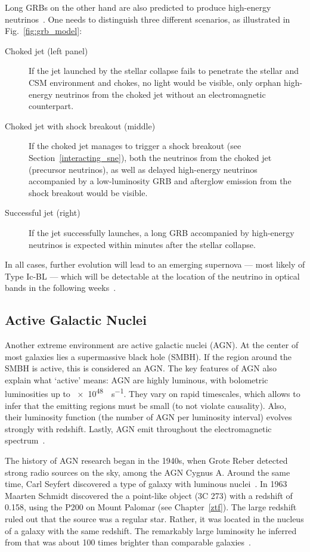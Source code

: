 Long GRBs on the other hand are also predicted to produce high-energy neutrinos~. One needs to distinguish three different scenarios, as illustrated in Fig.~\ref{fig:grb_model}:
\begin{description}
    \item[Choked jet (left panel)] If the jet launched by the stellar collapse fails to penetrate the stellar and CSM environment and chokes, no light would be visible, only orphan high-energy neutrinos from the choked jet without an electromagnetic counterpart.
    \item[Choked jet with shock breakout (middle)] If the choked jet manages to trigger a shock breakout (see Section~\ref{interacting_sne}), both the neutrinos from the choked jet (precursor neutrinos), as well as delayed high-energy neutrinos accompanied by a low-luminosity GRB and afterglow emission from the shock breakout would be visible.
    \item[Successful jet (right)] If the jet successfully launches, a long GRB accompanied by high-energy neutrinos is expected within minutes after the stellar collapse.
\end{description}

In all cases, further evolution will lead to an emerging supernova --- most likely of Type Ic-BL --- which will be detectable at the location of the neutrino in optical bands in the following weeks~.

\subsection{Active Galactic Nuclei}\label{agn}
Another extreme environment are active galactic nuclei (AGN). At the center of most galaxies lies a supermassive black hole (SMBH). If the region around the SMBH is active, this is considered an AGN\@. The key features of AGN also explain what `active' means: AGN are highly luminous, with bolometric luminosities up to \SI{e48}{\erg\per\s}. They vary on rapid timescales, which allows to infer that the emitting regions must be small (to not violate causality). Also, their luminosity function (the number of AGN per luminosity interval) evolves strongly with redshift. Lastly, AGN emit throughout the electromagnetic spectrum~.

The history of AGN research began in the 1940s, when Grote Reber detected strong radio sources on the sky, among the AGN Cygnus A. Around the same time, Carl Seyfert discovered a type of galaxy with luminous nuclei~. In 1963 Maarten Schmidt discovered the a point-like object (3C 273) with a redshift of 0.158, using the P200 on Mount Palomar (see Chapter~\ref{ztf}). The large redshift ruled out that the source was a regular star. Rather, it was located in the nucleus of a galaxy with the same redshift. The remarkably large luminosity he inferred from that was about 100 times brighter than comparable galaxies~.

